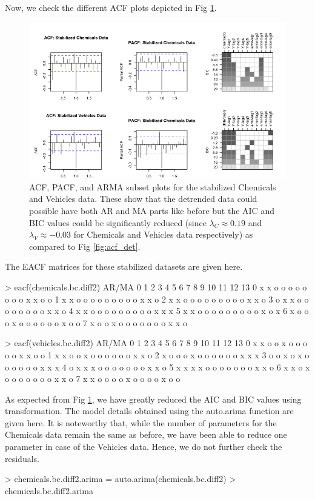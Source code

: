 \begin{enumerate}[label=(\roman*)]
Now, we check the different ACF plots depicted in Fig \ref{fig:acf_bc_det}.
\begin{figure}[!htb]
    \centering
    \includegraphics[width=\linewidth]{Images/P3/ACFs_BC_Plots.png}
    \caption[ACF, PACF, and ARMA subset plots for the stabilized Chemicals and Vehicles data.]{ACF, PACF, and ARMA subset plots for the stabilized Chemicals and Vehicles data. These show that the detrended data could possible have both AR and MA parts like before but the AIC and BIC values could be significantly reduced (since $\lambda_C \approx 0.19$ and $\lambda_V \approx -0.03$ for Chemicals and Vehicles data respectively) as compared to Fig \ref{fig:acf_det}.}
    \label{fig:acf_bc_det}
\end{figure}
The EACF matrices for these stabilized datasets are given here.
\small\begin{block}
> eacf(chemicals.bc.diff2)
AR/MA
  0 1 2 3 4 5 6 7 8 9 10 11 12 13
0 x x o o o o o o o o x  x  o  o 
1 x x o o o o o o o o o  x  x  o 
2 x x o o o o o o o o o  x  x  o 
3 o x x o o o o o o o o  x  x  o 
4 x x o o o o o o o o o  x  x  x 
5 x x o o o o o o o o o  x  o  x 
6 x o o o x o o o o o o  x  o  o 
7 x o o x o o o o o o o  x  x  o

> eacf(vehicles.bc.diff2)
AR/MA
  0 1 2 3 4 5 6 7 8 9 10 11 12 13
0 x x o o x o o o o o x  x  o  o 
1 x x o o x o o o o o o  x  x  o 
2 x o o o x o o o o o o  x  x  x 
3 o o x o x o o o o o o  x  x  x 
4 o x x x o o o o o o o  x  x  o 
5 x x x x o o o o o o o  x  x  o 
6 x x o x o o o o o o o  x  x  o 
7 x x o o o o x o o o o  x  o  o 
\end{block}
\normalsize As expected from Fig \ref{fig:acf_bc_det}, we have greatly reduced the AIC and BIC values using transformation. The model details obtained using the auto.arima function are given here. It is noteworthy that, while the number of parameters for the Chemicals data remain the same as before, we have been able to reduce one parameter in case of the Vehicles data. Hence, we do not further check the residuals.
\small\begin{block}
> chemicals.bc.diff2.arima = auto.arima(chemicals.bc.diff2)
> chemicals.bc.diff2.arima


\end{block}
\end{enumerate}
